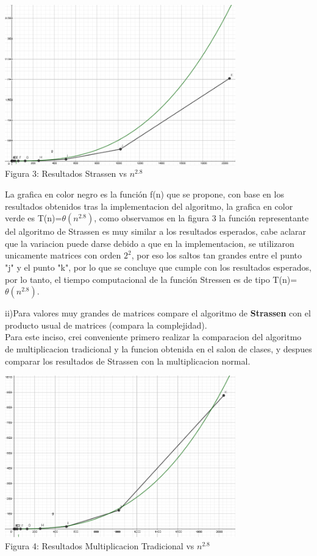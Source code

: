 \documentclass[spanish]{article}
\begin{document}
	\begin{center}
		\includegraphics[width=100mm]{./imagenes/fig4.png}\\
		Figura 3: Resultados Strassen vs $n^{2.8}$
	\end{center}
	La grafica en color negro es la función f(n) que se propone, con base en los resultados obtenidos tras la implementacion del algoritmo, la grafica en color verde es  T(n)=${\theta(n^{2.8})}$, como observamos en la figura 3 la función representante del algoritmo de Strassen es muy similar a los resultados esperados, cabe aclarar que la variacion puede darse debido a que en la implementacion, se utilizaron unicamente matrices con orden ${2^{2}}$, por eso los saltos tan grandes entre el punto "j" y el punto "k", por lo que se concluye que cumple con los resultados esperados, por lo tanto, el tiempo computacional de la función Stressen es de tipo T(n)=${\theta(n^{2.8})}$.\\
	\newpage

	{\large ii)Para valores muy grandes de matrices compare el algoritmo de {\bf Strassen} con el producto usual de matrices (compara la complejidad).}\\
	
	\bigskip
	Para este inciso, crei conveniente primero realizar la comparacion del algoritmo de multiplicacion tradicional y la funcion obtenida en el salon de clases, y despues comparar los resultados de Strassen con la multiplicacion normal.
	
	\begin{center}
		\includegraphics[width=100mm]{./imagenes/fig5.png}\\
		Figura 4: Resultados Multiplicacion Tradicional vs $n^{2.8}$
	\end{center}
\end{document}
